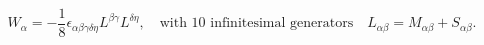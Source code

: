 \begin{equation}
W_{\alpha}=-\frac{1}{8}\epsilon_
{\alpha\beta\gamma\delta\eta}L^{\beta\gamma}L^{\delta\eta},
\quad\mbox{with  10 infinitesimal generators}\quad
L_{\alpha\beta}=M_{\alpha\beta}+S_{\alpha\beta}.
\end{equation}

